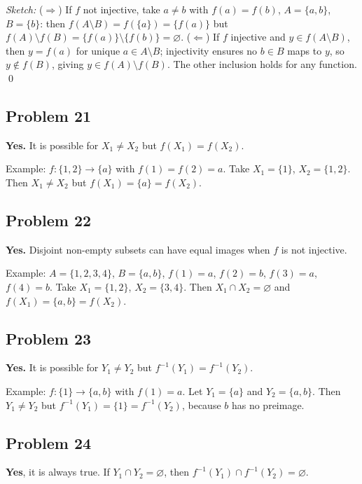 \emph{Sketch:} ($\Rightarrow$) If $f$ not injective, take $a\neq b$ with $f(a)=f(b)$, $A=\{a,b\}$, $B=\{b\}$: then $f(A\setminus B)=f(\{a\})=\{f(a)\}$ but $f(A)\setminus f(B)=\{f(a)\}\setminus\{f(b)\}=\varnothing$. ($\Leftarrow$) If $f$ injective and $y\in f(A\setminus B)$, then $y=f(a)$ for unique $a\in A\setminus B$; injectivity ensures no $b\in B$ maps to $y$, so $y\notin f(B)$, giving $y\in f(A)\setminus f(B)$. The other inclusion holds for any function. \qed

\subsection*{Problem 21}
\textbf{Yes.} It is possible for $X_1\neq X_2$ but $f(X_1)=f(X_2)$.

Example: $f:\{1,2\}\to\{a\}$ with $f(1)=f(2)=a$. Take $X_1=\{1\}$, $X_2=\{1,2\}$. Then $X_1\neq X_2$ but $f(X_1)=\{a\}=f(X_2)$.

\subsection*{Problem 22}
\textbf{Yes.} Disjoint non-empty subsets can have equal images when $f$ is not injective.

Example: $A=\{1,2,3,4\}$, $B=\{a,b\}$, $f(1)=a$, $f(2)=b$, $f(3)=a$, $f(4)=b$. Take $X_1=\{1,2\}$, $X_2=\{3,4\}$. Then $X_1\cap X_2=\varnothing$ and $f(X_1)=\{a,b\}=f(X_2)$.

\subsection*{Problem 23}
\textbf{Yes.} It is possible for $Y_1\neq Y_2$ but $f^{-1}(Y_1)=f^{-1}(Y_2)$.

Example: $f:\{1\}\to\{a,b\}$ with $f(1)=a$. Let $Y_1=\{a\}$ and $Y_2=\{a,b\}$. Then $Y_1\neq Y_2$ but $f^{-1}(Y_1)=\{1\}=f^{-1}(Y_2)$, because $b$ has no preimage.

\subsection*{Problem 24}
\textbf{Yes}, it is always true. If $Y_1\cap Y_2=\varnothing$, then $f^{-1}(Y_1)\cap f^{-1}(Y_2)=\varnothing$.

